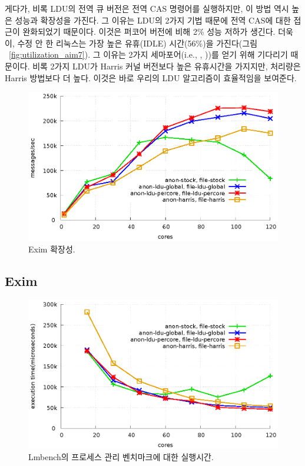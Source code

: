 게다가, 비록 LDU의 전역 큐 버전은 전역 CAS 명령어를 실행하지만, 이 방법 역시 높은 성능과 확장성을 가진다.
그 이유는 LDU의 2가지 기법 때문에 전역 CAS에 대한 접근이 완화되었기 때문이다.
이것은 퍼코어 버전에 비해 2\% 성능 저하가 생긴다. 
더욱이, 수정 안 한 리눅스는 가장 높은 유휴(IDLE) 시간(56\%)을 가진다(그림 ~\ref{fig:utilization_aim7}). 
그 이유는 2가지 세마포어(i.e.,
, ))를 얻기 위해 기다리기 때문이다.
비록 2가지 LDU가 Harris 커널 버전보다 높은 유휴시간을 가지지만, 처리량은 Harris 방법보다 더 높다.
이것은 바로 우리의 LDU 알고리즘이 효율적임을 보여준다. 

\begin{figure}[tb]
  \begin{center}
    \includegraphics[scale=1]{graph/exim.eps}
  \end{center}
  \caption{Exim 확장성.}
  \label{fig:exim}
\end{figure}

\subsection{Exim}

\begin{figure}[tb]
  \begin{center}
    \includegraphics[scale=1]{graph/lmbench.eps}
  \end{center}
  \caption{Lmbench의 프로세스 관리 벤치마크에 대한 실행시간.}
  \label{fig:MicroBench}
\end{figure}

